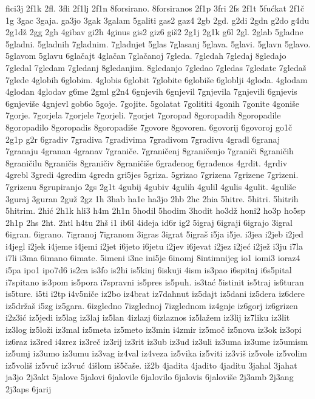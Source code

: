 {fici3j
2f1k
2fl.
3fli
2f1lj
2f1n
8forsirano.
8forsiranos
2f1p
3fri
2fs
2f1t
5fućkat
2f1č
1g
3gac
3gaja.
ga3jo
3gak
3galam
5galiti
gas2
gaz4
2gb
2gd.
g2di
2gdn
g2do
g4du
2g1dž
2gg
2gh
4gibav
gi2h
4ginus
gis2
giz6
giš2
2g1j
2g1k
g6l
2gl.
2glab
5gladne
5gladni.
5gladnih
7gladnim.
7gladnjet
5glas
7glasanj
5glava.
5glavi.
5glavn
5glavo.
5glavom
5glavu
6glačajt
4glačan
7glačanoj
7gleda.
7gledah
7gledaj
8gledajo
7gledal
7gledam
7gledanj
8gledanjim.
8gledanjo
7gledao
7gledas
7gledate
7gledaš
7glede
4globih
6globim.
4globis
6globit
7globite
6globiše
6globlji
4gloda.
4glodam
4glodan
4glodav
g6me
2gml
g2n4
6gnjevih
6gnjevil
7gnjevila
7gnjevili
6gnjevis
6gnjeviše
4gnjevl
gob6o
5goje.
7gojite.
5golatat
7golititi
4gonih
7gonite
4goniše
7gorje.
7gorjela
7gorjele
7gorjeli.
7gorjet
7goropad
8goropadih
8goropadile
8goropadilo
8goropadis
8goropadiše
7govore
8govoren.
6govorij
6govoroj
go1č
2g1p
g2r
6gradiv
7gradiva
7gradivima
7gradivom
7gradivu
4gradl
6granaj
7granaju
4granan
4granav
7graniče.
7graničenj
8graničenjo
7graniči
8graničih
8graničilu
8graničis
8graničiv
8graničiše
6građenog
6građenos
4grdit.
4grdiv
4grebl
3gredi
4gredim
4gredn
gri5jes
5griza.
5grizao
7grizena
7grizene
7grizeni.
7grizenu
8grupiranjo
2gs
2g1t
4gubij
4gubiv
4gulih
4gulil
4gulis
4gulit.
4guliše
3guraj
3guran
2guž
2gz
1h
3hab
ha1e
ha3jo
2hb
2hc
2hia
5hitre.
5hitri.
5hitrih
5hitrim.
2hić
2h1k
hli3
h4m
2h1n
5hodil
5hodim
3hodit
ho3dž
honi2
ho3p
ho5sp
2h1p
2hs
2ht.
2htl
h4tu
2hš
i1
ib6l
4ideja
id6r
ig2
5igraj
6igraji
6igrajo
3igral
6igran.
6igrano.
7igranoj
7igranom
3igras
3igrat
5igraš
i5ja
i5je.
i3jea
i2jeb
i2jed
i4jegl
i2jek
i4jeme
i4jemi
i2jet
i6jeto
i6jetu
i2jev
i6jevat
i2jez
i2jeć
i2jež
i3ju
i7la
i7li
i3ma
6imano
6imate.
5imeni
i3ne
ini5je
6inomj
8intimnijeg
io1
iomi3
ioraz4
i5pa
ipo1
ipo7d6
is2ca
is3fo
is2hi
is5kinj
6iskuji
4ism
is3pao
i6spitaj
i6s5pital
i7spitano
is3pom
is5pora
i7spravni
is5pres
is5puh.
is3tać
5istinit
is5traj
is6turan
is5ture.
i5ti
i2tp
i4v5niče
iz2bo
iz4brat
iz7dahnut
iz5dajt
iz5dani
iz5dera
iz6dere
iz5držaš
i5zg
iz5gara.
6izgledno
7izglednoj
7izglednom
iz4gnje
iz6gorj
iz6grizen
i2z3ić
iz5jedi
iz5lag
iz3laj
iz5lan
4izlazj
6izlaznos
iz5lažem
iz3lij
iz7liku
iz3lit
iz3log
iz5loži
iz3mal
iz5meta
iz5meto
iz3min
i4zmir
iz5moč
iz5nova
iz3ok
iz3opi
iz6raz
iz3red
i4zrez
iz3reč
iz3rij
iz3rit
iz3ub
iz3ud
iz3uli
iz3uma
iz3ume
iz5umism
iz5umj
iz3umo
iz3umu
iz3vag
iz4val
iz4veza
iz5vika
iz5viti
iz3viš
iz5vole
iz5volim
iz5voliš
iz5vuč
iz3vuć
4išlom
iš5čaše.
iž2b
4jadita
4jadito
4jaditu
3jahal
3jahat
ja3jo
2j3akt
5jalove
5jalovi
6jalovile
6jalovilo
6jalovis
6jaloviše
2j3amb
2j3ang
2j3aps
6jarij
}
